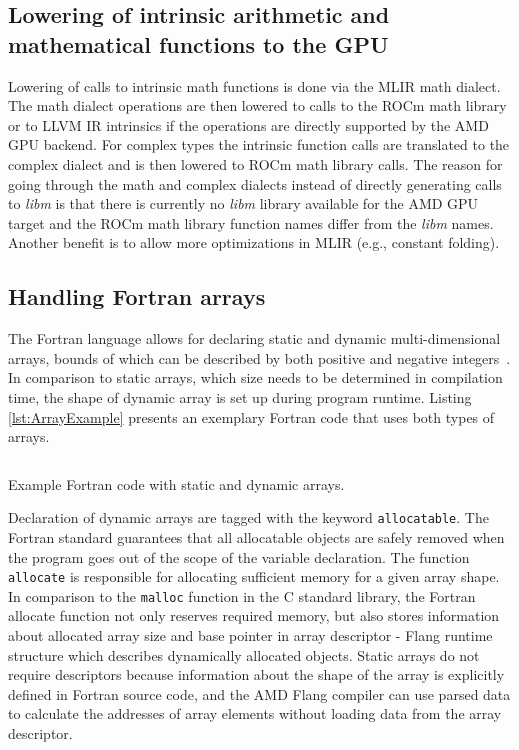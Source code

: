\documentclass[acmtog,natbib=false]{acmart}
\newcommand{\code}[1]{\texttt{#1}\xspace}
\newcommand{\trademark}[0]{\texttrademark\xspace}
\begin{document}
\subsection{Lowering of intrinsic arithmetic and mathematical functions to the GPU}
\label{sec:FortranIntrinsics}
Lowering of calls to intrinsic math functions is done via the \ac{MLIR} math dialect.
The math dialect operations are then lowered to calls to the ROCm\trademark math library or to LLVM \ac{IR} intrinsics if the operations are directly supported by the AMD GPU backend.
For complex types the intrinsic function calls are translated to the complex dialect and is then lowered to ROCm\trademark math library calls.
The reason for going through the math and complex dialects instead of directly generating calls to \textit{libm} is that there is currently no \textit{libm} library available for the AMD GPU target and the ROCm\trademark math library function names differ from the \textit{libm} names. Another benefit is to allow more optimizations in \ac{MLIR} (e.g., constant folding).
\subsection{Handling Fortran arrays}
The Fortran language allows for declaring static and dynamic multi-dimensional arrays, bounds of which can be described by both positive and negative integers~\cite{F2023}.
In comparison to static arrays, which size needs to be determined in compilation time, the shape of dynamic array is set up during program runtime.
Listing \ref{lst:ArrayExample} presents an exemplary Fortran code that uses both types of arrays.

\begin{listing}[t]
\inputminted{Fortran}{code/arrays.f90}
\caption{Example Fortran code with static and dynamic arrays.}
\label{lst:ArrayExample}
\end{listing}

Declaration of dynamic arrays are tagged with the keyword \code{allocatable}.
The Fortran standard guarantees that all allocatable objects are safely removed when the program goes out of the scope of the variable declaration.
The function \code{allocate} is responsible for allocating sufficient memory for a given array shape.
In comparison to the \code{malloc} function in the C standard library, the Fortran allocate function not only reserves required memory, but also stores information about allocated array size and base pointer in array descriptor - Flang runtime structure which describes dynamically allocated
objects.
Static arrays do not require descriptors because information about the shape of the array is explicitly defined in Fortran source code, and the AMD Flang compiler can use parsed data to calculate the addresses of array elements without loading data from the array descriptor.
\end{document}
